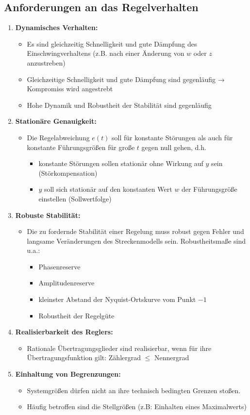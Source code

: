 \documentclass[10pt,a4paper]{article}
\begin{document}
\subsection{Anforderungen an das Regelverhalten}
\begin{enumerate}
	\item \textbf{Dynamisches Verhalten:}
	\begin{itemize}
		\item Es sind gleichzeitig Schnelligkeit und gute Dämpfung des Einschwingverhaltens (z.B. nach einer Änderung von $w$ oder $z$ anzustreben)
		\item Gleichzeitige Schnelligkeit und gute Dämpfung sind gegenläufig → Kompromiss wird angestrebt
		\item Hohe Dynamik und Robustheit der Stabilität sind gegenläufig
	\end{itemize}
	\item \textbf{Stationäre Genauigkeit:}
	\begin{itemize}
		\item Die Regelabweichung $e(t)$ soll für konstante Störungen als auch für konstante Führungsgrößen für große $t$ gegen null gehen, d.h.
		\begin{itemize}
			\item konstante Störungen sollen stationär ohne Wirkung auf $y$ sein (Störkompensation)
			\item $y$ soll sich stationär auf den konstanten Wert $w$ der Führungsgröße einstellen (Sollwertfolge)
		\end{itemize}
	\end{itemize}
	\item \textbf{Robuste Stabilität:}
	\begin{itemize}
		\item Die zu fordernde Stabilität einer Regelung muss robust gegen Fehler und langsame Veränderungen des Streckenmodells sein. Robustheitsmaße sind u.a.:
		\begin{itemize}
			\item Phasenreserve
			\item Amplitudenreserve
			\item kleinster Abstand der Nyquist-Ortskurve vom Punkt $-1$
			\item Robustheit der Regelgüte
		\end{itemize}
	\end{itemize}
	\item \textbf{Realisierbarkeit des Reglers:}
	\begin{itemize}
		\item Rationale Übertragungsglieder sind realisierbar, wenn für ihre Übertragungsfunktion gilt: Zählergrad $≤$ Nennergrad
	\end{itemize}
	\item \textbf{Einhaltung von Begrenzungen:}
	\begin{itemize}
		\item Systemgrößen dürfen nicht an ihre technisch bedingten Grenzen stoßen.
		\item Häufig betroffen sind die Stellgrößen (z.B: Einhalten eines Maximalwerts)
	\end{itemize}
\end{enumerate}
\end{document}
